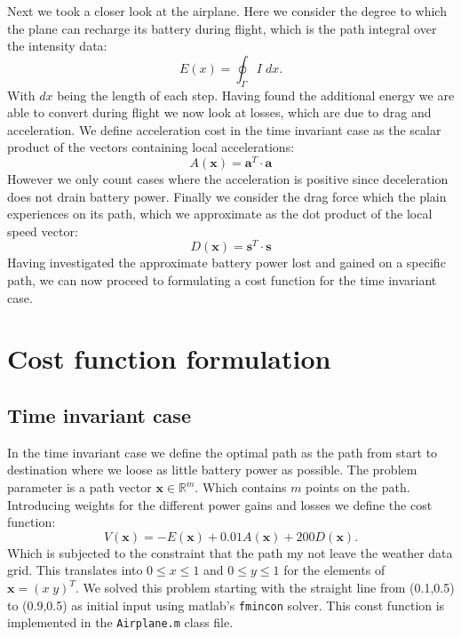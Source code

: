 \documentclass[ twoside,openright,titlepage,numbers=noenddot,headinclude,%
                footinclude=true,cleardoublepage=empty,abstractoff, %
                BCOR=5mm,paper=a4,fontsize=11pt,%
                ngerman,american,%
                ]{scrreprt}
\begin{document}
Next we took a closer look at the airplane. Here we consider the degree to which the plane can recharge its battery during flight, which is the path integral over the intensity data:
\begin{equation}
E(x) = \oint_{\Gamma} I  \; dx.
\end{equation}
With $dx$ being the length of each step. Having found the additional energy we are able to convert during flight we now look at losses, which are due to drag and acceleration. We define acceleration cost in the time invariant case as the scalar product of the vectors containing local accelerations:
\begin{equation}
A(\mathbf{x}) = \mathbf{a}^T \cdot \mathbf{a}
\end{equation}
 However we only count cases where the acceleration is positive since deceleration does not drain battery power.
Finally we consider the drag force which the plain experiences on its path, which we approximate as the dot product of the local speed vector:
\begin{equation}
D(\mathbf{x}) = \mathbf{s}^T \cdot \mathbf{s}
\end{equation}
Having investigated the approximate battery power lost and gained on a specific path, we can now proceed to formulating a cost function for the time invariant case.

\section{Cost function formulation}
\subsection{Time invariant case}
In the time invariant case we define the optimal path as the path from start to destination where we loose as little battery power as possible. The problem parameter is a path vector $\mathbf{x} \in \mathbb{R}^m$. Which contains $m$ points on the path. Introducing weights for the different power gains and losses we define the cost function:
\begin{equation}
V(\mathbf{x}) = - E(\mathbf{x}) +0.01A(\mathbf{x}) + 200D(\mathbf{x}).
\end{equation}
Which is subjected to the constraint that the path my not leave the weather data grid. This translates into $0 \leq x \leq 1$ and $0 \leq y \leq 1$ for the elements of $\mathbf{x} = (x \; y)^T$. We solved this problem starting with the straight line from (0.1,0.5) to (0.9,0.5) as initial input using matlab's \texttt{fmincon} solver. This const function is implemented in the \texttt{Airplane.m} class file.
\end{document}

